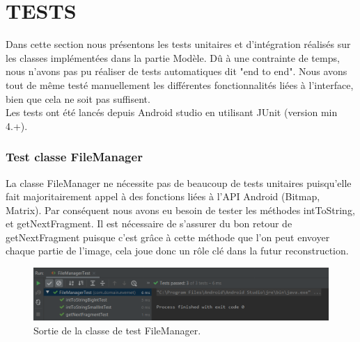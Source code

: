 \chapter{ TESTS}
Dans cette section nous présentons les tests unitaires et d'intégration réalisés sur les classes implémentées dans la partie Modèle. Dû à une contrainte de temps, nous n'avons pas pu réaliser de tests automatiques dit "end to end".  Nous avons tout de même testé manuellement les différentes fonctionnalités liées à l'interface, bien que cela ne soit pas suffisent.
\\
Les tests ont été lancés depuis Android studio en utilisant JUnit (version min 4.+). 

\subsection{Test classe FileManager}
La classe FileManager ne nécessite pas de beaucoup de tests unitaires puisqu'elle fait majoritairement appel à des fonctions liées à l'API Android (Bitmap, Matrix). 
Par conséquent nous avons eu besoin de tester les méthodes intToString, et getNextFragment.
Il est nécessaire de s'assurer du bon retour de getNextFragment puisque c'est grâce à cette méthode que l'on peut envoyer chaque partie de l'image, cela joue donc un rôle clé dans la futur reconstruction.

\begin{figure}[H]
    \includegraphics[width=18cm]{images/fileManagerOutput.png}
    \caption{Sortie de la classe de test FileManager.}
\end{figure}

